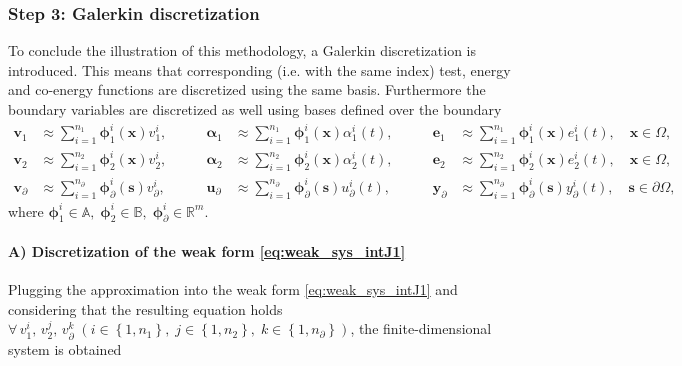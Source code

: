 {\centering \subsubsection*{Step 3: Galerkin discretization}} 
To conclude the illustration of this methodology, a Galerkin discretization is introduced. This means that corresponding (i.e. with the same index) test, energy and co-energy functions are discretized using the same basis. Furthermore the boundary variables are discretized as well using bases defined over the boundary
\begin{equation}\label{eq:approx_vaeb}
\begin{aligned}
\bm{v}_1 &\approx \sum_{i=1}^{n_1} \bm{\phi}_1^i(\bm{x}) v_1^i, \\
\bm{v}_2 &\approx \sum_{i=1}^{n_2} \bm{\phi}_2^i(\bm{x}) v_2^i, \\
\bm{v}_\partial &\approx \sum_{i=1}^{n_\partial} \bm{\phi}_\partial^i(\bm{s}) v_\partial^i,
\end{aligned} \qquad 
\begin{aligned}
\bm{\alpha}_1 &\approx \sum_{i=1}^{n_1} \bm{\phi}_1^i(\bm{x}) \alpha_1^i(t), \\
\bm{\alpha}_2 &\approx \sum_{i=1}^{n_2} \bm{\phi}_2^i(\bm{x}) \alpha_2^i(t), \\
\bm{u}_\partial &\approx \sum_{i=1}^{n_\partial} \bm{\phi}_\partial^i(\bm{s}) u_\partial^i(t), 
\end{aligned} \qquad 
\begin{aligned}
\bm{e}_1 &\approx \sum_{i=1}^{n_1} \bm{\phi}_1^i(\bm{x}) e_1^i(t), \quad \bm{x} \in \Omega, \\
\bm{e}_2 &\approx \sum_{i=1}^{n_2} \bm{\phi}_2^i(\bm{x}) e_2^i(t), \quad \bm{x} \in \Omega,\\
\bm{y}_\partial &\approx \sum_{i=1}^{n_\partial} \bm{\phi}_\partial^i(\bm{s}) y_\partial^i(t), \quad \bm{s} \in \partial\Omega,
\end{aligned}
\end{equation}
where $\bm{\phi}_1^i  \in \mathbb{A}, \; \bm{\phi}_2^i  \in \mathbb{B}, \; \bm{\phi}_\partial^i \in \mathbb{R}^m$.

\paragraph{A) Discretization of the weak form \eqref{eq:weak_sys_intJ1}}
Plugging the approximation into the weak form \eqref{eq:weak_sys_intJ1} and considering that the resulting equation holds $\forall \, v_1^i,\, v_2^j,\, v_\partial^k \; (i\in\left\{1,n_1\right\}, \; j\in\left\{1,n_2\right\}, \; k\in\left\{1,n_\partial\right\})$, the finite-dimensional system is obtained

